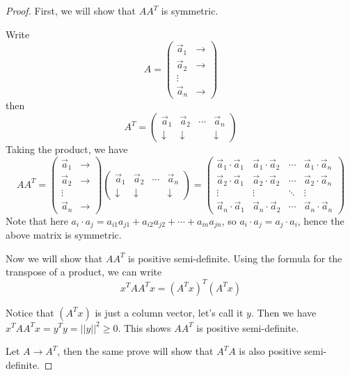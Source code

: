 \documentclass{article}
\begin{document}
\begin{proof}
First, we will show that $AA^T$ is symmetric.

Write $$A = \begin{pmatrix} \vec{a}_1  & \rightarrow \\
\vec{a}_2 & \rightarrow \\ \vdots \\ \vec{a}_n & \rightarrow\end{pmatrix} $$
then $$A^T = \begin{pmatrix} \vec{a}_{1} & \vec{a}_{2}  & \cdots  &\vec{a}_n\\
\downarrow &\downarrow  &  & \downarrow \end{pmatrix} $$
Taking the product, we have
$$ A A^T = \begin{pmatrix} \vec{a}_1  & \rightarrow \\
\vec{a}_2 & \rightarrow \\ \vdots \\ \vec{a}_n & \rightarrow\end{pmatrix}  \begin{pmatrix} \vec{a}_{1} & \vec{a}_{2}  & \cdots  &\vec{a}_n\\
\downarrow &\downarrow  &  & \downarrow \end{pmatrix} = \begin{pmatrix} \vec{a}_1 \cdot \vec{a}_1 & \vec{a}_1 \cdot \vec{a}_2  & \cdots & \vec{a}_1 \cdot \vec{a}_n\\ \vec{a}_2 \cdot \vec{a}_1 & \vec{a}_2 \cdot \vec{a}_2 & \cdots &\vec{a}_2 \cdot \vec{a}_n \\
\vdots& \vdots & \ddots & \vdots \\
\vec{a}_n \cdot \vec{a}_1 & \vec{a}_n \cdot \vec{a}_2 & \cdots & \vec{a} _n \cdot \vec{a}_n \end{pmatrix} 
$$
Note that here $a_i \cdot a_j = a_{i1}a_{j1} + a_{i2}a_{j2} + \cdots + a_{in}a_{jn}$, so $a_i \cdot a_j = a_j \cdot a_i$, hence the above matrix is symmetric.

Now we will show that $AA^T$ is positive semi-definite. Using the formula for the transpose of a product, we can write
$$x^T AA^T x = (A^Tx)^T (A^Tx) $$

Notice that $(A^Tx)$ is just a column vector, let's call it $y$. Then we have $x^T AA^T x = y^T y = ||y||^2 \ge 0$. This shows $AA^T$ is positive semi-definite. 

Let $A \rightarrow A^T$, then the same prove will show that $A^TA$ is also positive semi-definite.
\end{proof}
\bigskip
\end{document}
